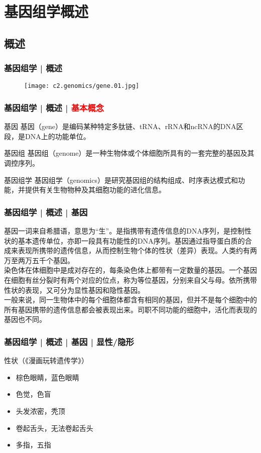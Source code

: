 \section{基因组学概述}
\subsection{概述}
\begin{frame}
  \frametitle{基因组学 | 概述}
  \begin{figure}
    \centering
    \texttt{[image: c2.genomics/gene.01.jpg]}
  \end{figure}
\end{frame}

\begin{frame}
  \frametitle{基因组学 | 概述 | \textcolor{red}{基本概念}}
  \begin{block}{基因}
基因（gene）是编码某种特定多肽链、tRNA、rRNA和ncRNA的DNA区段，是DNA上的功能单位。
  \end{block}
  \pause
  \begin{block}{基因组}
 基因组（genome）是一种生物体或个体细胞所具有的一套完整的基因及其调控序列。
  \end{block}
  \pause
  \begin{block}{基因组学}
 基因组学（genomics）是研究基因组的结构组成、时序表达模式和功能，并提供有关生物物种及其细胞功能的进化信息。 
  \end{block}
\end{frame}

\begin{frame}
  \frametitle{基因组学 | 概述 | 基因}
基因一词来自希腊语，意思为“生”。是指携带有遗传信息的DNA序列，是控制性状的基本遗传单位，亦即一段具有功能性的DNA序列。基因通过指导蛋白质的合成来表现所携带的遗传信息，从而控制生物个体的性状（差异）表现。人类约有两万至两万五千个基因。\\
\vspace{1em}
染色体在体细胞中是成对存在的，每条染色体上都带有一定数量的基因。一个基因在细胞有丝分裂时有两个对应的位点，称为等位基因，分别来自父与母。依所携带性状的表现，又可分为显性基因和隐性基因。\\
\vspace{1em}
一般来说，同一生物体中的每个细胞体都含有相同的基因，但并不是每个细胞中的所有基因携带的遗传信息都会被表现出来。司职不同功能的细胞中，活化而表现的基因也不同。
\end{frame}

\begin{frame}
  \frametitle{基因组学 | 概述 | 基因 | 显性/隐形}
  \begin{block}{性状（《漫画玩转遗传学》）}
    \begin{itemize}
      \item 棕色眼睛，蓝色眼睛
      \item 色觉，色盲
      \item 头发浓密，秃顶
      \item 卷起舌头，无法卷起舌头
      \item 多指，五指
    \end{itemize}
  \end{block}
\end{frame}

